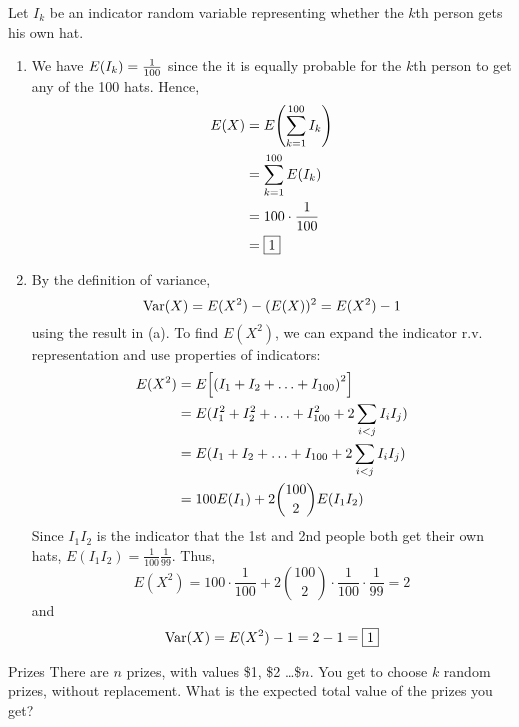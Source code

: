 \documentclass[11pt]{article}
\begin{document}
\begin{solution}{4}
Let $I_k$ be an indicator random variable representing whether the $k$th person gets his own hat.
\begin{enumerate}
\item We have $E\paren{I_k} = \frac{1}{100}$ since the it is equally probable for the $k$th person to get any of the 100 hats. Hence,
\begin{align*}
E(X) &= E\paren{\sum_{k=1}^{100} I_k} \\
&= \sum_{k=1}^{100} E\paren{I_k} \\
&= 100 \cdot \frac{1}{100} \\
&= \boxed{1}
\end{align*}
\item By the definition of variance,
$$\textrm{Var}(X) = E(X^2) - (E(X))^2 = E(X^2) - 1$$
using the result in (a). To find $E(X^2)$, we can expand the indicator r.v. representation and use properties of indicators:
\begin{align*}
E(X^2) &= E\brack{\paren{I_1 + I_2 + \ldots + I_{100}}^2} \\
&= E(I_1^2 + I_2^2 + \ldots + I_{100}^2 + 2\sum_{i < j}I_i I_j) \\
&= E(I_1 + I_2 + \ldots + I_{100} + 2\sum_{i < j}I_i I_j) \\
&= 100 E(I_1) + 2 \binom{100}{2} E(I_1 I_2) \\
\end{align*}
Since $I_1 I_2$ is the indicator that the 1st and 2nd people both get their own hats, $E(I_1 I_2) = \frac{1}{100}\frac{1}{99}$. Thus,
$$E(X^2) = 100 \cdot \frac{1}{100} + 2 \binom{100}{2} \cdot \frac{1}{100} \cdot \frac{1}{99} = 2$$
and
$$\textrm{Var}(X) = E(X^2) - 1 = 2 - 1 = \boxed{1}$$
\end{enumerate}
\end{solution}


\begin{exercise}{Prizes}
There are $n$ prizes, with values \$1, \$2 \ldots \$$n$. You get to choose $k$ random prizes, without replacement. What is the expected total value of the prizes you get? 

\end{exercise} 
\end{document}

